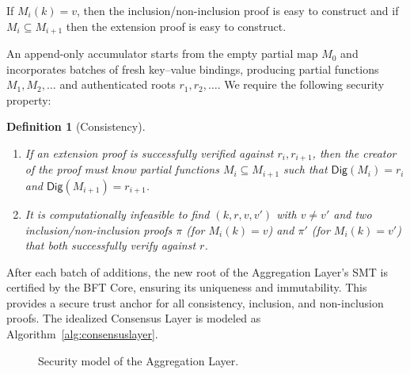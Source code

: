 \documentclass[twocolumn]{article}
\newtheorem{definition}{Definition}
\begin{document}
If $M_i(k)=v$, then the inclusion/non-inclusion proof is easy to construct and if $M_{i}\subseteq M_{i+1}$ then the extension proof is easy to construct.

An append-only accumulator starts from the empty partial map $M_0$ and incorporates batches of fresh key--value bindings, producing partial functions $M_1,M_2,\ldots$ and authenticated roots $r_1,r_2,\ldots$. We require the following security property:

\begin{definition}[Consistency]
\begin{enumerate}[nosep,label=(\roman*)]
  \item If an extension proof is successfully verified against $r_i,r_{i+1}$, then the creator of the proof must know partial functions $M_i\subseteq M_{i+1}$ such that $\mathsf{Dig}(M_i)=r_i$ and $\mathsf{Dig}(M_{i+1})=r_{i+1}$.
  \item It is computationally infeasible to find $(k,r,v,v')$ with $v\neq v'$ and two inclusion/non-inclusion proofs
  $\pi$ (for $M_i(k)=v$) and $\pi'$ (for $M_i(k)=v'$) that both successfully verify against $r$.
\end{enumerate}
\label{def:append-only-accumulator}
\end{definition}

After each batch of additions, the new root of the Aggregation Layer's SMT is certified by the BFT Core, ensuring its uniqueness and immutability. This provides a secure trust anchor for all consistency, inclusion, and non-inclusion proofs. The idealized Consensus Layer is modeled as Algorithm~\ref{alg:consensuslayer}.


\begin{figure}[!htbp]
    \centering
{}
    \caption{Security model of the Aggregation Layer.}\label{fig:model}
\end{figure}
\end{document}

